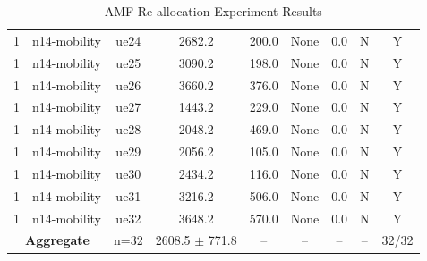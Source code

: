 \begin{table}[ht]
\begin{tabular}{|c|c|c|c|c|c|c|c|c|}
1 & n14-mobility & ue24 & 2682.2 & 200.0 & None & 0.0 & N & Y \\
1 & n14-mobility & ue25 & 3090.2 & 198.0 & None & 0.0 & N & Y \\
1 & n14-mobility & ue26 & 3660.2 & 376.0 & None & 0.0 & N & Y \\
1 & n14-mobility & ue27 & 1443.2 & 229.0 & None & 0.0 & N & Y \\
1 & n14-mobility & ue28 & 2048.2 & 469.0 & None & 0.0 & N & Y \\
1 & n14-mobility & ue29 & 2056.2 & 105.0 & None & 0.0 & N & Y \\
1 & n14-mobility & ue30 & 2434.2 & 116.0 & None & 0.0 & N & Y \\
1 & n14-mobility & ue31 & 3216.2 & 506.0 & None & 0.0 & N & Y \\
1 & n14-mobility & ue32 & 3648.2 & 570.0 & None & 0.0 & N & Y \\
\multicolumn{2}{|c|}{\textbf{Aggregate}} & n=32 & 2608.5 $\pm$ 771.8 & -- & -- & -- & -- & 32/32 \\
\hline
\end{tabular}
\caption{AMF Re-allocation Experiment Results}
\label{tab:amf_realloc}
\end{table}
